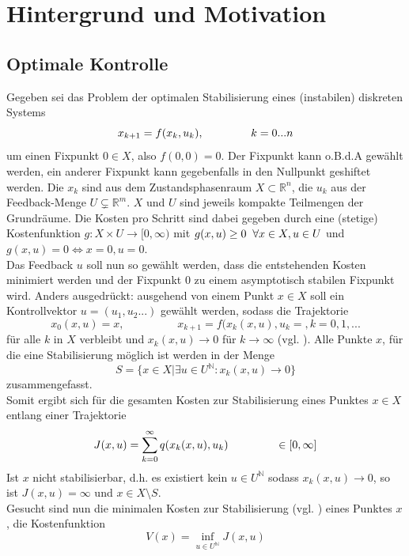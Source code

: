 \documentclass[12pt,a4paper,twoside]{article}
\begin{document}
\section{Hintergrund und Motivation}
	\subsection{Optimale Kontrolle}
	Gegeben sei das Problem der optimalen Stabilisierung eines (instabilen) diskreten Systems
	\begin{equation}
		x_{k+1}=f(x_k,u_k), \hspace{1,5cm} k=0...n
	\end{equation}
	um einen Fixpunkt $0\in X$, also $f(0,0)=0$. Der Fixpunkt kann o.B.d.A gewählt werden, ein anderer Fixpunkt kann 
	gegebenfalls in den Nullpunkt geshiftet werden. Die $x_k$ sind aus dem Zustandsphasenraum $X\subset \mathbb{R}^n
	$, die $u_k$ aus der Feedback-Menge $U\subsetneq \mathds{R}^m$. $X$ und $U$ sind jeweils kompakte Teilmengen der 
	Grundräume. Die Kosten pro Schritt sind dabei gegeben durch eine (stetige) Kostenfunktion $g: X\times U
	\rightarrow [0,\infty)$ mit $g(x,u)\geq 0 \hspace{0,2cm}\forall x\in X, u\in U$ und $g(x,u)=0 \Leftrightarrow 
	x=0, u=0$. \\
	Das Feedback $u$ soll nun so gewählt werden, dass die entstehenden Kosten minimiert werden und der Fixpunkt $0$ 
	zu einem asymptotisch stabilen Fixpunkt wird. Anders ausgedrückt: ausgehend von einem Punkt $x\in X$ soll ein
	Kontrollvektor $u=(u_1,u_2...)$ gewählt werden, sodass die Trajektorie 
	\begin{equation*}
		x_0(x,u)=x, \hspace{2cm} x_{k+1}=f(x_k(x,u),u_k=, k=0,1,...
	\end{equation*}
	für alle $k$ in $X$ verbleibt und $x_k(x,u)\rightarrow 0$ für $k\rightarrow\infty$ (vgl. \cite{Grune2005}). Alle Punkte $x$, für die eine Stabilisierung möglich ist werden in der Menge 
	\begin{equation*}
		S=\{x\in X| \exists u\in U^{\mathds{N}}: x_k(x,u)\rightarrow 0\}
	\end{equation*}
	zusammengefasst. \\
	Somit ergibt sich für die gesamten Kosten zur Stabilisierung eines Punktes $x\in X$ entlang einer Trajektorie
	\begin{equation}
		J(x,u)=\sum_{k=0}^{\infty}q(x_k(x,u),u_k) \hspace{1.5cm} \in [0,\infty]
	\end{equation}
	Ist $x$ nicht stabilisierbar, d.h. es existiert kein $u\in U^{\mathds{N}}$ sodass $x_k(x,u)\rightarrow 0$, so ist $J(x,u)=\infty$ und $x\in X\setminus S$. \\
	Gesucht sind nun die minimalen Kosten zur Stabilisierung (vgl. \cite{Junge2004}) eines Punktes $x$, die Kostenfunktion
	\begin{equation}
		\label{eq:valuefunction}
		V(x)=\inf_{u\in U^{\mathds{N}}}J(x,u)
	\end{equation}
\end{document}
